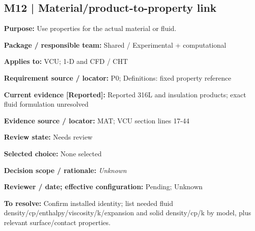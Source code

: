 \documentclass[11pt]{article}
\begin{document}
\begin{minipage}{\textwidth}\small\setlength{\parskip}{2pt}
\subsection*{M12 | Material/product-to-property link}
\textbf{Purpose:} Use properties for the actual material or fluid.\par
\textbf{Package / responsible team:} Shared / Experimental + computational\par
\textbf{Applies to:} VCU; 1-D and CFD / CHT\par
\textbf{Requirement source / locator:} P0; Definitions: fixed property reference\par
\textbf{Current evidence [Reported]:} Reported 316L and insulation products; exact fluid formulation unresolved\par
\textbf{Evidence source / locator:} MAT; VCU section lines 17-44\par
\textbf{Review state:} Needs review\par
\textbf{Selected choice:} None selected\par
\textbf{Decision scope / rationale:} \textit{Unknown}\par
\textbf{Reviewer / date; effective configuration:} Pending; Unknown\par
\textbf{To resolve:} Confirm installed identity; list needed fluid density/cp/enthalpy/viscosity/k/expansion and solid density/cp/k by model, plus relevant surface/contact properties.\par
\end{minipage}\par\vspace{5pt}
\end{document}
